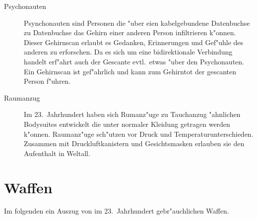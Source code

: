 \begin{appendices}
\begin{description}
\item [Psychonauten] Psynchonauten sind Personen die "uber eien kabelgebundene Datenbuchse zu Datenbuchse das Gehirn
      einer anderen Person infiltrieren k"onnen. Dieser Gehirnscan erlaubt es Gedanken, Erinnerungen und Gef"uhle des anderen zu erforschen. Da es sich um eine bidirektionale Verbindung handelt erf"ahrt auch der Gescante evtl.~etwas "uber den Psychonauten. Ein Gehirnscan ist gef"ahrlich und kann zum Gehirntot der gescanten Person f"uhren.
\item [Raumanzug] Im 23.~Jahrhundert haben sich Rumanz"uge zu Tauchanzug "ahnlichen Bodysuites entwickelt die unter
      normaler Kleidung getragen werden k"onnen. Raumanz"uge sch"utzen vor Druck und Temperaturunterschieden. Zusammen mit Druckluftkanistern und Gesichtsmasken erlauben sie den Aufenthalt in Weltall.
\end{description}

\section{Waffen}

Im folgenden ein Auszug von im 23.~Jahrhundert gebr"auchlichen Waffen.



\end{appendices}

